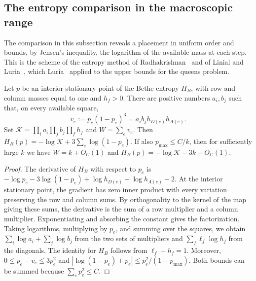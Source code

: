 \subsection{The entropy comparison in the macroscopic range}
The comparison in this subsection reveals a placement in uniform order and bounds, by Jensen's
inequality, the logarithm of the available mass at each step. This is the scheme of the entropy
method of Radhakrishnan~\cite{radhakrishnan} and of Linial and Luria~\cite{linialluria}, which
Luria~\cite{luria} applied to the upper bounds for the queens problem.

\begin{lema}\label{coste-vacancias}
Let $p$ be an interior stationary point of the Bethe entropy $H_B$, with row and column masses
equal to one and $h_f>0$. There are positive numbers $a_i,b_j$ such that, on every available square,
\[
 v_e:=p_e(1-p_e)^3=a_i b_j h_{D(e)}h_{A(e)} .
\]
Set $\mathcal K=\prod_i a_i\prod_j b_j\prod_f h_f$ and $W=\sum_e v_e$. Then
$H_B(p)=-\log\mathcal K+3\sum_e\log(1-p_e)$. If also $p_{\max}\le C/k$, then for
sufficiently large $k$ we have $W=k+O_C(1)$ and $H_B(p)=-\log\mathcal K-3k+O_C(1)$.
\end{lema}
\begin{proof}
The derivative of $H_B$ with respect to $p_e$ is
$-\log p_e-3\log(1-p_e)+\log h_{D(e)}+\log h_{A(e)}-2$.
At the interior stationary point, the gradient has zero inner product with every variation
preserving the row and column sums. By orthogonality to the kernel of the map giving these sums,
the derivative is the sum of a row multiplier and a column multiplier. Exponentiating and
absorbing the constant gives the factorization. Taking logarithms, multiplying by $p_e$, and
summing over the squares, we obtain $\sum_i\log a_i+\sum_j\log b_j$ from the two sets of
multipliers and $\sum_f\ell_f\log h_f$ from the diagonals.
The identity for $H_B$ follows from $\ell_f+h_f=1$. Moreover, $0\le p_e-v_e\le3p_e^2$ and
$|\log(1-p_e)+p_e|\le p_e^2/(1-p_{\max})$. Both bounds can be summed because $\sum_e p_e^2\le C$.
\end{proof}

